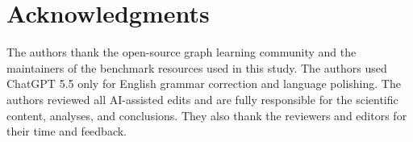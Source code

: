 \section{Acknowledgments}

The authors thank the open-source graph learning community and the maintainers of the benchmark resources used in this study. The authors used ChatGPT 5.5 only for English grammar correction and language polishing. The authors reviewed all AI-assisted edits and are fully responsible for the scientific content, analyses, and conclusions. They also thank the reviewers and editors for their time and feedback.
 